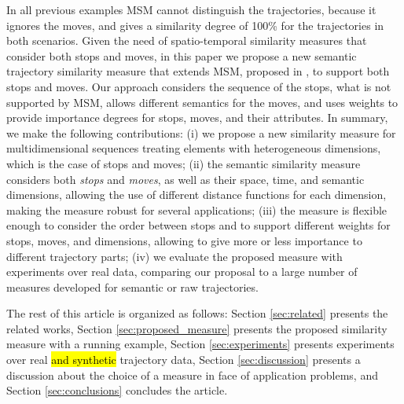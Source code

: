 \documentclass[12pt]{article}
\begin{document}

In all previous examples MSM cannot distinguish the trajectories, because it ignores the moves, and gives a similarity degree of 100\% for the trajectories in both scenarios.
Given the need of spatio-temporal similarity measures that consider both stops and moves, in this paper we propose a new semantic trajectory similarity measure that extends MSM, proposed in \cite{Furtado:TGIS12156}, to support both stops and moves. Our approach considers the sequence of the stops, what is not supported by MSM, allows different semantics for the moves, and uses weights to provide importance degrees for stops, moves, and their attributes. 
In summary, we make the following contributions:
(i) we propose a new similarity measure for multidimensional sequences treating elements with heterogeneous dimensions, which is the case of stops and moves; (ii) the semantic similarity measure considers both \textit{stops} and \textit{moves}, as well as their space, time, and semantic dimensions, allowing the use of different distance functions for each dimension, making the measure robust for several applications; (iii) the measure is flexible enough to consider the order between stops and to support different weights for stops, moves, and dimensions, allowing to give more or less importance to different trajectory parts; (iv) we evaluate the proposed measure with experiments over real data, comparing our proposal to a large number of measures developed for semantic or raw trajectories.

The rest of this article is organized as follows: Section \ref{sec:related} presents the related works, Section \ref{sec:proposed_measure} presents the proposed similarity measure with a running example, Section \ref{sec:experiments} presents experiments over real \hl{and synthetic} trajectory data, Section \ref{sec:discussion} presents a discussion about the choice of a measure in face of application problems, and Section \ref{sec:conclusions} concludes the article.
\end{document}
